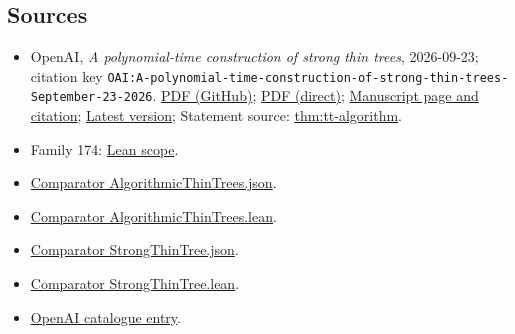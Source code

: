 \documentclass[11pt]{article}
\begin{document}
\subsection{Sources}
\begin{itemize}
\item OpenAI, \emph{A polynomial-time construction of strong thin trees}, 2026-09-23; citation key \texttt{OAI:A-polynomial-time-construction-of-strong-thin-trees-September-23-2026}. \href{https://github.com/openai/math/blob/adc7f1241b42e322a6451854ab7e4b4c146bf78a/preprints/A-polynomial-time-construction-of-strong-thin-trees-September-23-2026/paper.pdf}{PDF (GitHub)}; \href{https://github.com/openai/math/raw/adc7f1241b42e322a6451854ab7e4b4c146bf78a/preprints/A-polynomial-time-construction-of-strong-thin-trees-September-23-2026/paper.pdf}{PDF (direct)}; \href{https://github.com/openai/math/blob/adc7f1241b42e322a6451854ab7e4b4c146bf78a/preprints/A-polynomial-time-construction-of-strong-thin-trees-September-23-2026/README.md}{Manuscript page and citation}; \href{https://github.com/openai/math/blob/main/preprints/A-polynomial-time-construction-of-strong-thin-trees-September-23-2026/paper.pdf}{Latest version}; Statement source: \href{https://github.com/openai/math/blob/adc7f1241b42e322a6451854ab7e4b4c146bf78a/preprints/A-polynomial-time-construction-of-strong-thin-trees-September-23-2026/build/source/sections/main-theorem.tex\#L1}{thm:tt-algorithm}.
\item Family 174: \href{https://github.com/openai/math/blob/adc7f1241b42e322a6451854ab7e4b4c146bf78a/lean/docs/174.md}{Lean scope}.
\item \href{https://github.com/openai/math/blob/adc7f1241b42e322a6451854ab7e4b4c146bf78a/lean/ComparatorChallenges/AlgorithmicThinTrees.json}{Comparator AlgorithmicThinTrees.json}.
\item \href{https://github.com/openai/math/blob/adc7f1241b42e322a6451854ab7e4b4c146bf78a/lean/ComparatorChallenges/AlgorithmicThinTrees.lean}{Comparator AlgorithmicThinTrees.lean}.
\item \href{https://github.com/openai/math/blob/adc7f1241b42e322a6451854ab7e4b4c146bf78a/lean/ComparatorChallenges/StrongThinTree.json}{Comparator StrongThinTree.json}.
\item \href{https://github.com/openai/math/blob/adc7f1241b42e322a6451854ab7e4b4c146bf78a/lean/ComparatorChallenges/StrongThinTree.lean}{Comparator StrongThinTree.lean}.
\item \href{https://github.com/openai/math/blob/adc7f1241b42e322a6451854ab7e4b4c146bf78a/CONTENTS.md}{OpenAI catalogue entry}.
\end{itemize}
\end{document}
